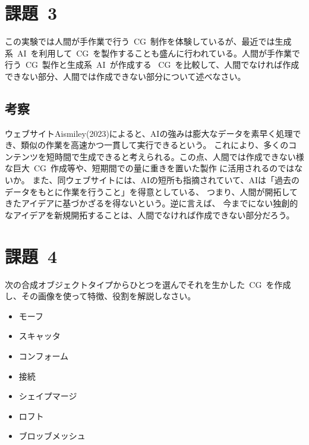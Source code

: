 \documentclass[a4j]{jarticle}
\begin{document}
\newpage
\section{課題\ 3}
この実験では人間が手作業で行う\ CG\ 制作を体験しているが、最近では生成系\ AI\ を利用して\ CG\ を製作することも盛んに行われている。人間が手作業で行う\ CG\ 製作と生成系\ AI\ が作成する
\ CG\ を比較して、人間でなければ作成できない部分、人間では作成できない部分について述べなさい。
\subsection{考察}
%
ウェブサイトAismiley(2023)によると、AIの強みは膨大なデータを素早く処理でき、類似の作業を高速かつ一貫して実行できるという\cite{Aismiley}。
これにより、多くのコンテンツを短時間で生成できると考えられる。この点、人間では作成できない様な巨大\ CG\ 作成等や、短期間での量に重きを置いた製作
に活用されるのではないか。 また、同ウェブサイトには、AIの短所も指摘されていて、AIは「過去のデータをもとに作業を行うこと」を得意としている、
つまり、人間が開拓してきたアイデアに基づかざるを得ないという\cite{Aismiley}。逆に言えば、
今までにない独創的なアイデアを新規開拓することは、人間でなければ作成できない部分だろう。
%

\newpage
\section{課題\ 4}
次の合成オブジェクトタイプからひとつを選んでそれを生かした\ CG\ を作成し、その画像を使って特徴、役割を解説しなさい。
\begin{itemize}
  \item[■] モーフ
  \item[■] スキャッタ
  \item[■] コンフォーム
  \item[■] 接続
  \item[■] シェイプマージ
  \item[■] ロフト
  \item[■] ブロッブメッシュ
\end{itemize}
\end{document}
